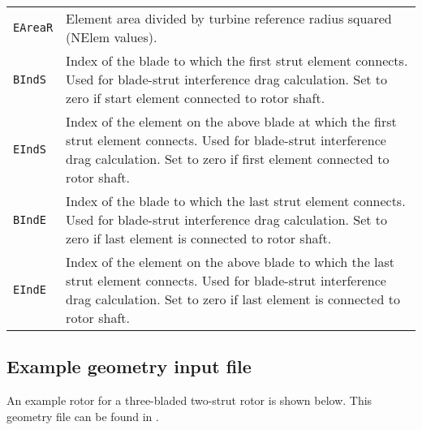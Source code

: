 \begin{longtable}{p{}p{}}
\texttt{EAreaR}  & Element area divided by turbine reference radius squared (NElem values). \\
\rowcolor{highlightcolor}\texttt{BIndS}   & Index of the blade to which the first strut element connects. Used for blade-strut interference drag calculation. Set to zero if start element connected to rotor shaft. \\
\rowcolor{highlightcolor}\texttt{EIndS}   & Index of the element on the above blade at which the first strut element connects. Used for blade-strut interference drag calculation. Set to zero if first element connected to rotor shaft. \\
\rowcolor{highlightcolor}\texttt{BIndE}   & Index of the blade to which the last strut element connects. Used for blade-strut interference drag calculation. Set to zero if last element is connected to rotor shaft. \\
\rowcolor{highlightcolor}\texttt{EIndE}   & Index of the element on the above blade to which the last strut element connects. Used for blade-strut interference drag calculation. Set to zero if last element is connected to rotor shaft. \\
\bottomrule
\end{longtable}

\subsection{Example geometry input file}
An example rotor for a three-bladed two-strut rotor is shown below. This geometry file can be found in .


